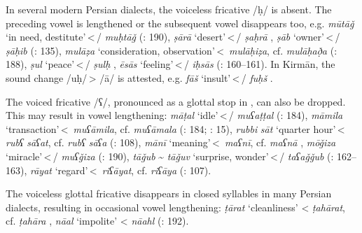 \documentclass[output=paper]{langsci/langscibook}
\begin{document}

In several modern Persian dialects, the voiceless  fricative /ḥ/ is absent. The preceding vowel is lengthened or the subsequent vowel disappears too, e.g. \textit{mūtāǧ} ‘in need, destitute’\,<\,/ \textit{muḥtāǧ} (\citealt{Īzadpanāh2001}: 190), \textit{ṣārā} ‘desert’\,<\,/ \textit{ṣaḥrā} \citep[15]{Sarlak2002}, \textit{ṣāb} ‘owner’\,<\,/ \textit{ṣāḥib} (\citealt{Ṣarrāfī1996}: 135), \textit{mulāẓa} ‘consideration, observation’\,<\, \textit{mulāḥiẓa}, cf.  \textit{mulāḥað̣a} (\citealt{Ṣarrāfī1996}: 188), \textit{ṣul} ‘peace’\,<\,/ \textit{ṣulḥ} \citep{Stilo2001}, \textit{ēsās} ‘feeling’\,<\,/ \textit{iḥsās} (\citealt{Salāmī2004}: 160–161). In Kirmān, the sound change /uḥ/\,> /ā/ is attested, e.g. \textit{fāš} ‘insult’\,<\,/ \textit{fuḥš} \citep{Borjian2017}.

The voiced  fricative /ʕ/, pronounced as a glottal stop in , can also be dropped. This may result in vowel lengthening: \textit{māṭal} ‘idle’\,<\,/ \textit{muʕaṭṭal} (\citealt{Ṣarrāfī1996}: 184), \textit{māmila} ‘transaction’\,<\, \textit{muʕāmila}, cf. \linebreak \textit{muʕāmala} (\citealt{Ṣarrāfī1996}: 184; \citealt{Sarlak2002}: 15), \textit{rubbi} \textit{sāt} ‘quarter hour’\,<\, \textit{rubʕ} \textit{sāʕat}, cf.  \textit{rubʕ} \textit{sāʕa} (\citealt{Ṣarrāfī1996}: 108), \textit{mānī} ‘meaning’\,<\, \textit{maʕnī}, cf.  \textit{maʕnā} \citep[15]{Sarlak2002}, \textit{mōǧiza} ‘miracle’\,<\,/ \textit{muʕǧiza} (\citealt{Īzadpanāh2001}: 190), \textit{tāǧub} \~{} \textit{tāǧuv} ‘surprise, wonder’\,<\,/ \textit{taʕaǧǧub} (\citealt{Salāmī2004}: 162–163), \textit{rāyat} ‘regard’\,<\, \textit{riʕāyat}, cf.  \textit{riʕāya} (\citealt{Ṣarrāfī1996}: 107).


The voiceless glottal fricative disappears in closed syllables in many Persian dialects, resulting in occasional vowel lengthening: \textit{ṭārat} ‘cleanliness’ <  \textit{ṭahārat}, cf.  \textit{ṭahāra} \citep[76]{Sarlak2002}, \textit{nāal} ‘impolite’ <  \textit{nāahl} (\citealt{Īzadpanāh2001}: 192).
\end{document}
